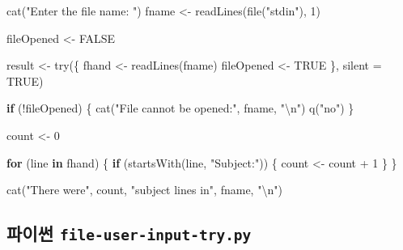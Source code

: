 \documentclass[
  letterpaper,
]{book}
\newenvironment{Shaded}{\begin{snugshade}}{\end{snugshade}}
\newcommand{\AttributeTok}[1]{\textcolor[rgb]{0.40,0.45,0.13}{#1}}
\newcommand{\ConstantTok}[1]{\textcolor[rgb]{0.56,0.35,0.01}{#1}}
\newcommand{\ControlFlowTok}[1]{\textcolor[rgb]{0.00,0.23,0.31}{\textbf{#1}}}
\newcommand{\DecValTok}[1]{\textcolor[rgb]{0.68,0.00,0.00}{#1}}
\newcommand{\FunctionTok}[1]{\textcolor[rgb]{0.28,0.35,0.67}{#1}}
\newcommand{\NormalTok}[1]{\textcolor[rgb]{0.00,0.23,0.31}{#1}}
\newcommand{\OtherTok}[1]{\textcolor[rgb]{0.00,0.23,0.31}{#1}}
\newcommand{\SpecialCharTok}[1]{\textcolor[rgb]{0.37,0.37,0.37}{#1}}
\newcommand{\StringTok}[1]{\textcolor[rgb]{0.13,0.47,0.30}{#1}}
\begin{document}
\begin{Shaded}
\begin{Highlighting}[]
\FunctionTok{cat}\NormalTok{(}\StringTok{"Enter the file name: "}\NormalTok{)}
\NormalTok{fname }\OtherTok{\textless{}{-}} \FunctionTok{readLines}\NormalTok{(}\FunctionTok{file}\NormalTok{(}\StringTok{"stdin"}\NormalTok{), }\DecValTok{1}\NormalTok{) }

\NormalTok{fileOpened }\OtherTok{\textless{}{-}} \ConstantTok{FALSE}

\NormalTok{result }\OtherTok{\textless{}{-}} \FunctionTok{try}\NormalTok{(\{}
\NormalTok{  fhand }\OtherTok{\textless{}{-}} \FunctionTok{readLines}\NormalTok{(fname)}
\NormalTok{  fileOpened }\OtherTok{\textless{}{-}} \ConstantTok{TRUE}
\NormalTok{\}, }\AttributeTok{silent =} \ConstantTok{TRUE}\NormalTok{)}

\ControlFlowTok{if}\NormalTok{ (}\SpecialCharTok{!}\NormalTok{fileOpened) \{}
  \FunctionTok{cat}\NormalTok{(}\StringTok{"File cannot be opened:"}\NormalTok{, fname, }\StringTok{"}\SpecialCharTok{\textbackslash{}n}\StringTok{"}\NormalTok{)}
  \FunctionTok{q}\NormalTok{(}\StringTok{"no"}\NormalTok{)}
\NormalTok{\}}

\NormalTok{count }\OtherTok{\textless{}{-}} \DecValTok{0}

\ControlFlowTok{for}\NormalTok{ (line }\ControlFlowTok{in}\NormalTok{ fhand) \{}
  \ControlFlowTok{if}\NormalTok{ (}\FunctionTok{startsWith}\NormalTok{(line, }\StringTok{"Subject:"}\NormalTok{)) \{}
\NormalTok{    count }\OtherTok{\textless{}{-}}\NormalTok{ count }\SpecialCharTok{+} \DecValTok{1}
\NormalTok{  \}}
\NormalTok{\}}

\FunctionTok{cat}\NormalTok{(}\StringTok{"There were"}\NormalTok{, count, }\StringTok{"subject lines in"}\NormalTok{, fname, }\StringTok{"}\SpecialCharTok{\textbackslash{}n}\StringTok{"}\NormalTok{)}
\end{Highlighting}
\end{Shaded}

\subsection{\texorpdfstring{파이썬
\texttt{file-user-input-try.py}}{파이썬 file-user-input-try.py}}\label{uxd30cuxc774uxc36c-file-user-input-try.py}
\end{document}
